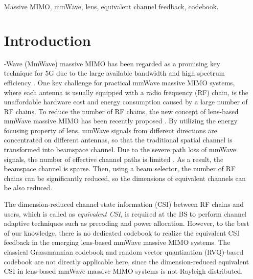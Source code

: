 \documentclass[10pt,twocolumn,twoside]{IEEEtran}
\begin{document}
\begin{IEEEkeywords}
Massive MIMO, mmWave, lens, equivalent channel feedback, codebook.
\end{IEEEkeywords}
\IEEEpeerreviewmaketitle

\section{Introduction}\label{S1}
-Wave (MmWave) massive MIMO has been regarded as a promising key technique for 5G due to the large available bandwidth and high spectrum efficiency \cite{JTSP_HRobert_OverviewMmwave}.
One key challenge for practical mmWave massive MIMO systems, where each antenna is usually equipped with a radio frequency (RF) chain, is the unaffordable hardware cost and energy consumption caused by a large number of RF chains.
To reduce the number of RF chains, the new concept of lens-based mmWave massive MIMO has been recently proposed \cite{TAP_JBrady_Beamspace,ICASSP_GSong_BeamspaceTransceivers,JSAC_YZeng_Electromagnetic,TCOM_YZeng_PDMA}.
By utilizing the energy focusing property of lens, mmWave signals from different directions are concentrated on different antennas, so that the traditional spatial channel is transformed into beamspace channel.
Due to the severe path loss of mmWave signals, the number of effective channel paths is limited \cite{Access_TSRappaport_mmwave}.
As a result, the beamspace channel is sparse. 
Then, using a beam selector, the number of RF chains can be significantly reduced, so the dimensions of equivalent channels can be also reduced.

The dimension-reduced channel state information (CSI) between RF chains and users, which is called as \textit{equivalent CSI}, is required at the BS to perform channel adaptive techniques such as precoding and power allocation.
However, to the best of our knowledge, there is no dedicated codebook to realize the equivalent CSI feedback in the emerging lens-based mmWave massive MIMO systems.
The classical Grassmannian codebook \cite{TIT_DJLove_Grassmannian} and random vector quantization (RVQ)-based codebook \cite{TIT_NJindal_MIMOBroadcast} are not directly applicable here, since the dimension-reduced equivalent CSI in lens-based mmWave massive MIMO systems is not Rayleigh distributed.
\end{document}
